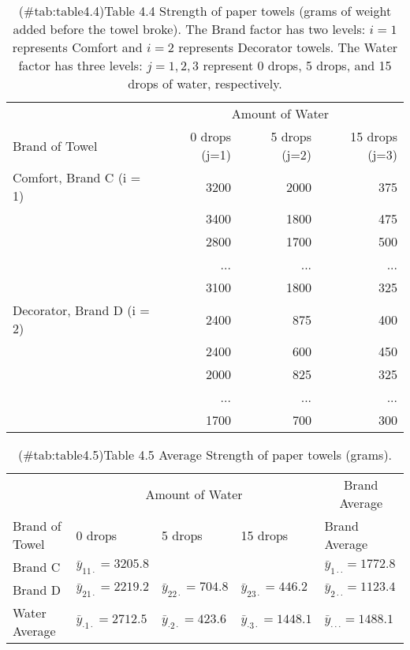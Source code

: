 \documentclass[
]{report}
\theoremstyle{definition}
\theoremstyle{definition}
\theoremstyle{definition}
\theoremstyle{definition}
\theoremstyle{remark}
\begin{document}
\begin{table}[!h]
\centering
\caption{(\#tab:table4.4)Table 4.4 Strength of paper towels (grams of weight added before the towel broke). The Brand factor has two levels: $i=1$ represents Comfort and $i=2$ represents Decorator towels. The Water factor has three levels: $j=1,2,3$ represent 0 drops, 5 drops, and 15 drops of water, respectively.}
\centering
\begin{tabular}[t]{lrrr}
\toprule
\multicolumn{1}{c}{ } & \multicolumn{3}{c}{Amount of Water} \\
\cmidrule(l{3pt}r{3pt}){2-4}
Brand of Towel & 0 drops (j=1) & 5 drops (j=2) & 15 drops (j=3)\\
\midrule
Comfort, Brand C (i = 1) & 3200 & 2000 & 375\\
 & 3400 & 1800 & 475\\
 & 2800 & 1700 & 500\\
 & ... & ... & ...\\
 & 3100 & 1800 & 325\\
\addlinespace
Decorator, Brand D (i = 2) & 2400 & 875 & 400\\
 & 2400 & 600 & 450\\
 & 2000 & 825 & 325\\
 & ... & ... & ...\\
 & 1700 & 700 & 300\\
\bottomrule
\end{tabular}
\end{table}

\begin{table}[!h]
\centering
\caption{(\#tab:table4.5)Table 4.5 Average Strength of paper towels (grams).}
\centering
\begin{tabular}[t]{lllll}
\toprule
\multicolumn{1}{c}{ } & \multicolumn{3}{c}{Amount of Water} & \multicolumn{1}{c}{Brand Average} \\
\cmidrule(l{3pt}r{3pt}){2-4} \cmidrule(l{3pt}r{3pt}){5-5}
Brand of Towel & 0 drops & 5 drops & 15 drops & Brand Average\\
\midrule
Brand C & $\bar y_{11\cdot} = 3205.8$ &  &  & $\bar y_{1\cdot\cdot} = 1772.8$\\
Brand D & $\bar y_{21\cdot} = 2219.2$ & $\bar y_{22\cdot} = 704.8$ & $\bar y_{23\cdot} = 446.2$ & $\bar y_{2\cdot\cdot} = 1123.4$\\
Water Average & $\bar y_{\cdot1\cdot} = 2712.5$ & $\bar y_{\cdot2\cdot} = 423.6$ & $\bar y_{\cdot3\cdot} = 1448.1$ & $\bar y_{\cdot\cdot\cdot} = 1488.1$\\
\bottomrule
\end{tabular}
\end{table}
\end{document}
